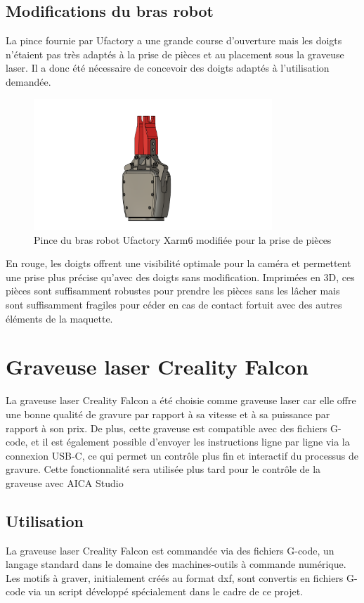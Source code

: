\subsection{Modifications du bras robot}
La pince fournie par Ufactory a une grande course d'ouverture mais les doigts n'étaient pas très adaptés à la prise de pièces et au placement sous la graveuse laser. Il a donc été nécessaire de concevoir des doigts adaptés à l'utilisation demandée.
\begin{figure}[H]
    \centering
    \includegraphics[width=0.8\textwidth]{assets/figures/Pince_Xarm6.png}
    \caption{Pince du bras robot Ufactory Xarm6 modifiée pour la prise de pièces}
    \label{fig:pince_robot}
\end{figure}

En rouge, les doigts offrent une visibilité optimale pour la caméra et permettent une prise plus précise qu'avec des doigts sans modification. Imprimées en 3D, ces pièces sont suffisamment robustes pour prendre les pièces sans les lâcher mais sont suffisamment fragiles pour céder en cas de contact fortuit avec des autres éléments de la maquette.

\section{Graveuse laser Creality Falcon}

La graveuse laser Creality Falcon a été choisie comme graveuse laser car elle offre une bonne qualité de gravure par rapport à sa vitesse et à sa puissance par rapport à son prix. De plus, cette graveuse est compatible avec des fichiers G-code, et il est également possible d'envoyer les instructions ligne par ligne via la connexion USB-C, ce qui permet un contrôle plus fin et interactif du processus de gravure. Cette fonctionnalité sera utilisée plus tard pour le contrôle de la graveuse avec AICA Studio

\subsection{Utilisation}
La graveuse laser Creality Falcon est commandée via des fichiers G-code, un langage standard dans le domaine des machines-outils à commande numérique. Les motifs à graver, initialement créés au format \gls{dxf}, sont convertis en fichiers G-code via un script développé spécialement dans le cadre de ce projet.

